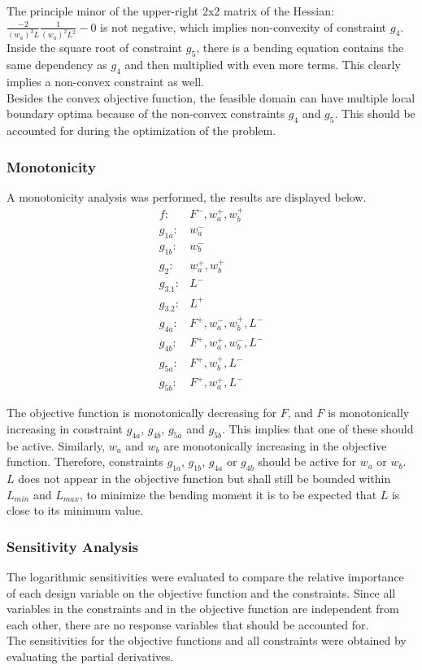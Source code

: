 The principle minor of the upper-right 2x2 matrix of the Hessian: $\frac{-2}{\left( w_a \right)^3 L } \frac{1}{\left( w_a \right)^2 L^2 } - 0 $ is not negative, which implies non-convexity of constraint $g_4$.\\

Inside the square root of constraint $g_5$, there is a bending equation contains the same dependency as $g_4$ and then multiplied with even more terms. This clearly implies a non-convex constraint as well. \\
Besides the convex objective function, the feasible domain can have multiple local boundary optima because of the non-convex constraints $g_4$ and $g_5$. This should be accounted for during the optimization of the problem.

\subsubsection{Monotonicity}
A monotonicity analysis was performed, the results are displayed below. 
\begin{align*}
	f: & F^-, w_a^+, w_b^+ \\
	g_{1a}:& w_a^- \\
	g_{1b}:& w_b^- \\
	g_{2}:& w_a^+, w_b^+\\
	g_{3.1}:& L^- \\
	g_{3.2}:& L^+ \\
	g_{4a}:& F^+, w_a^-, w_b^+, L^- \\
	g_{4b}:& F^+, w_a^+, w_b^-, L^-\\
	g_{5a}:& F^+, w_b^+, L^-\\
	g_{5b}:& F^+, w_a^+, L^-
\end{align*}

The objective function is monotonically decreasing for $F$, and $F$ is monotonically increasing in constraint $g_{4a}$, $g_{4b}$, $g_{5a}$ and $g_{5b}$. This implies that one of these should be active. Similarly, $w_a$ and $w_b$ are monotonically increasing in the objective function. Therefore, constraints $g_{1a}$, $g_{1b}$, $g_{4a}$ or $g_{4b}$ should be active for $w_a$ or $w_b$. $L$ does not appear in the objective function but shall still be bounded within $L_{min}$ and $L_{max}$, to minimize the bending moment it is to be expected that $L$ is close to its minimum value. 




\subsubsection{Sensitivity Analysis}
The logarithmic sensitivities were evaluated to compare the relative importance of each design variable on the objective function and the constraints. Since all variables in the constraints and in the objective function are independent from each other, there are no response variables that should be accounted for. \\
The sensitivities for the objective functions and all constraints were obtained by evaluating the partial derivatives. 

